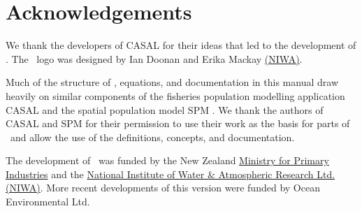 \section{Acknowledgements\label{sec:acknowledgements}}

We thank the developers of CASAL \citep{1388} for their ideas that led to the development of \CNAME. The \CNAME\ logo was designed by Ian Doonan and Erika Mackay \href{http://www.niwa.co.nz}{(NIWA)}.

Much of the structure of \CNAME, equations, and documentation in this manual draw heavily on similar components of the fisheries population modelling application CASAL \citep{1388} and  the spatial population model SPM \citep{SPM}. We thank the authors of CASAL and SPM for their permission to use their work as the basis for parts of \CNAME\ and allow the use of the definitions, concepts, and documentation.

The development of \CNAME\ was funded by the New Zealand \href{http://www.mpi.govt.nz}{Ministry for Primary Industries} and the \href{http://www.niwa.co.nz}{National Institute of Water \& Atmospheric Research Ltd. (NIWA)}. More recent developments of this version were funded by Ocean Environmental Ltd.
